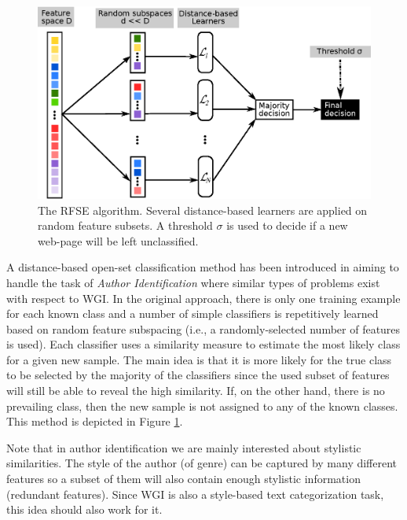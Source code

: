 \begin{figure}[t]
	\begin{center}
    	\includegraphics[scale=0.70]{Figures/RFSE_diagrams.eps}
		\caption{The RFSE algorithm. Several distance-based learners are applied on random feature subsets. A threshold $\sigma$ is used to decide if a new web-page will be left unclassified.}
		\label{chap:openset:fig:rfse_single_decision}
	\end{center}
\end{figure}


A distance-based open-set classification method has been introduced in \parencite{koppel2011authorship} aiming to handle the task of \textit{Author Identification} where similar types of problems exist with respect to WGI. In the original approach, there is only one training example for each known class and a number of simple classifiers is repetitively learned based on random feature subspacing (i.e., a randomly-selected number of features is used). Each classifier uses a similarity measure to estimate the most likely class for a given new sample. The main idea is that it is more likely for the true class to be selected by the majority of the classifiers since the used subset of features will still be able to reveal the high similarity. If, on the other hand, there is no prevailing class, then the new sample is not assigned to any of the known classes. This method is depicted in Figure \ref{chap:openset:fig:rfse_single_decision}. 

Note that in author identification we are mainly interested about stylistic similarities. The style of the author (of genre) can be captured by many different features so a subset of them will also contain enough stylistic information (redundant features). Since WGI is also a style-based text categorization task, this idea should also work for it.

